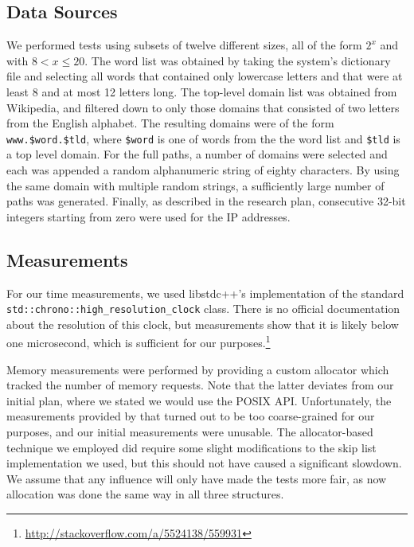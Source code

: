 \documentclass[12pt,a4paper]{article}
\begin{document}
    \subsection{Data Sources}

    We performed tests using subsets of twelve different sizes, all of the form $2^x$ and with $8 <
    x \le 20$.  The word list was obtained by taking the system's dictionary file and selecting all
    words that contained only lowercase letters and that were at least 8 and at most 12 letters
    long.  The top-level domain list was obtained from Wikipedia, and filtered down to only those
    domains that consisted of two letters from the English alphabet.  The resulting domains were of
    the form \texttt{www.\$word.\$tld}, where \texttt{\$word} is one of words from the the word list
    and \texttt{\$tld} is a top level domain.  For the full paths, a number of domains were selected
    and each was appended a random alphanumeric string of eighty characters.  By using the same
    domain with multiple random strings, a sufficiently large number of paths was generated.
    Finally, as described in the research plan, consecutive 32-bit integers starting from zero were used
    for the IP addresses.

    \subsection{Measurements}
    \label{subsec:measurements}

    For our time measurements, we used libstdc++'s implementation of the standard
    \texttt{std::chrono::high\_resolution\_clock} class.  There is no official documentation about
    the resolution of this clock, but measurements show that it is likely below one microsecond,
    which is sufficient for our purposes.\footnote{\url{http://stackoverflow.com/a/5524138/559931}}

    Memory measurements were performed by providing a custom allocator which tracked the number of
    memory requests.  Note that the latter deviates from our initial plan, where we stated we would
    use the POSIX API.  Unfortunately, the measurements provided by that turned out to be too
    coarse-grained for our purposes, and our initial measurements were unusable.  The
    allocator-based technique we employed did require some slight modifications to the skip list
    implementation we used, but this should not have caused a significant slowdown.  We assume that
    any influence will only have made the tests more fair, as now allocation was done the same way
    in all three structures.
\end{document}
